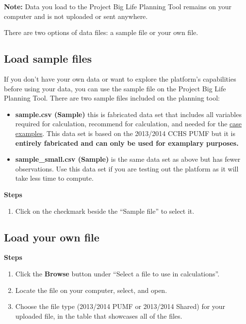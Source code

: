 \documentclass[]{book}
\providecommand{\tightlist}{%
  \setlength{\itemsep}{0pt}\setlength{\parskip}{0pt}}
\begin{document}
\textbf{Note:} Data you load to the Project Big Life Planning Tool
remains on your computer and is not uploaded or sent anywhere.

There are two options of data files: a sample file or your own file.

\subsection{Load sample files}\label{load-sample-files}

If you don't have your own data or want to explore the platform's
capabilities before using your data, you can use the sample file on the
Project Big Life Planning Tool. There are two sample files included on
the planning tool:

\begin{itemize}
\tightlist
\item
  \textbf{sample.csv (Sample)} this is fabricated data set that includes
  all variables required for calculation, recommend for calculation, and
  needed for the \protect\hyperlink{caseexamples}{case examples}. This
  data set is based on the 2013/2014 CCHS PUMF but it is
  \textbf{entirely fabricated and can only be used for examplary
  purposes.}
\item
  \textbf{sample\_small.csv (Sample)} is the same data set as above but
  has fewer observations. Use this data set if you are testing out the
  platform as it will take less time to compute.
\end{itemize}

\textbf{Steps}

\begin{enumerate}
\def\labelenumi{\arabic{enumi}.}
\tightlist
\item
  Click on the checkmark beside the ``Sample file'' to select it.
\end{enumerate}

\subsection{Load your own file}\label{load-your-own-file}

\textbf{Steps}

\begin{enumerate}
\def\labelenumi{\arabic{enumi}.}
\item
  Click the \textbf{Browse} button under ``Select a file to use in
  calculations''.
\item
  Locate the file on your computer, select, and open.
\item
  Choose the file type (2013/2014 PUMF or 2013/2014 Shared) for your
  uploaded file, in the table that showcases all of the files.
\end{enumerate}
\end{document}
